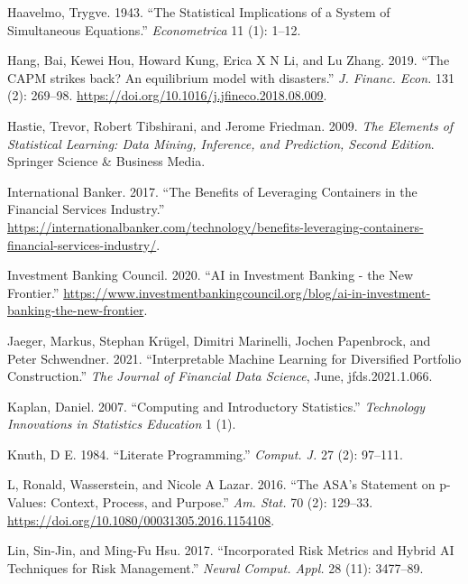 \documentclass{article}
\newlength{\cslhangindent}
\newenvironment{CSLReferences}[2] %
 {%
  \setlength{\parindent}{0pt}
  \ifodd #1 \everypar{\setlength{\hangindent}{\cslhangindent}}\ignorespaces\fi
  \ifnum #2 > 0
  \setlength{\parskip}{#2\baselineskip}
  \fi
 }%
 {}
\begin{document}
\begin{CSLReferences}{1}{0}
\leavevmode{}%
Haavelmo, Trygve. 1943. {``The Statistical Implications of a System of
Simultaneous Equations.''} \emph{Econometrica} 11 (1): 1--12.

\leavevmode{}%
Hang, Bai, Kewei Hou, Howard Kung, Erica X N Li, and Lu Zhang. 2019.
{``{The CAPM strikes back? An equilibrium model with disasters}.''}
\emph{J. Financ. Econ.} 131 (2): 269--98.
\url{https://doi.org/10.1016/j.jfineco.2018.08.009}.

\leavevmode{}%
Hastie, Trevor, Robert Tibshirani, and Jerome Friedman. 2009. \emph{The
Elements of Statistical Learning: Data Mining, Inference, and
Prediction, Second Edition}. Springer Science \& Business Media.

\leavevmode{}%
International Banker. 2017. {``The Benefits of Leveraging Containers in
the Financial Services Industry.''}
\url{https://internationalbanker.com/technology/benefits-leveraging-containers-financial-services-industry/}.

\leavevmode{}%
Investment Banking Council. 2020. {``{AI} in Investment Banking - the
New Frontier.''}
\url{https://www.investmentbankingcouncil.org/blog/ai-in-investment-banking-the-new-frontier}.

\leavevmode{}%
Jaeger, Markus, Stephan Krügel, Dimitri Marinelli, Jochen Papenbrock,
and Peter Schwendner. 2021. {``Interpretable Machine Learning for
Diversified Portfolio Construction.''} \emph{The Journal of Financial
Data Science}, June, jfds.2021.1.066.

\leavevmode{}%
Kaplan, Daniel. 2007. {``Computing and Introductory Statistics.''}
\emph{Technology Innovations in Statistics Education} 1 (1).

\leavevmode{}%
Knuth, D E. 1984. {``Literate Programming.''} \emph{Comput. J.} 27 (2):
97--111.

\leavevmode{}%
L, Ronald, Wasserstein, and Nicole A Lazar. 2016. {``{The ASA's
Statement on p-Values: Context, Process, and Purpose}.''} \emph{Am.
Stat.} 70 (2): 129--33.
\url{https://doi.org/10.1080/00031305.2016.1154108}.

\leavevmode{}%
Lin, Sin-Jin, and Ming-Fu Hsu. 2017. {``Incorporated Risk Metrics and
Hybrid {AI} Techniques for Risk Management.''} \emph{Neural Comput.
Appl.} 28 (11): 3477--89.


\end{CSLReferences}
\end{document}
